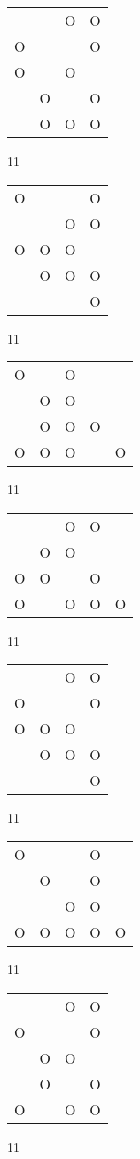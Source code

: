 \begin{tabular}{|m{0.2cm}m{0.2cm}m{0.2cm}m{0.2cm}|}\hline
 & &O&O\\
O& & &O\\
O& &O& \\
 &O& &O\\
 &O&O&O\\
\hline\end{tabular}11
\begin{tabular}{|m{0.2cm}m{0.2cm}m{0.2cm}m{0.2cm}|}\hline
O& & &O\\
 & &O&O\\
O&O&O& \\
 &O&O&O\\
 & & &O\\
\hline\end{tabular}11
\begin{tabular}{|m{0.2cm}m{0.2cm}m{0.2cm}m{0.2cm}m{0.2cm}|}\hline
O& &O& & \\
 &O&O& & \\
 &O&O&O& \\
O&O&O& &O\\
\hline\end{tabular}11
\begin{tabular}{|m{0.2cm}m{0.2cm}m{0.2cm}m{0.2cm}m{0.2cm}|}\hline
 & &O&O& \\
 &O&O& & \\
O&O& &O& \\
O& &O&O&O\\
\hline\end{tabular}11
\begin{tabular}{|m{0.2cm}m{0.2cm}m{0.2cm}m{0.2cm}|}\hline
 & &O&O\\
O& & &O\\
O&O&O& \\
 &O&O&O\\
 & & &O\\
\hline\end{tabular}11
\begin{tabular}{|m{0.2cm}m{0.2cm}m{0.2cm}m{0.2cm}m{0.2cm}|}\hline
O& & &O& \\
 &O& &O& \\
 & &O&O& \\
O&O&O&O&O\\
\hline\end{tabular}11
\begin{tabular}{|m{0.2cm}m{0.2cm}m{0.2cm}m{0.2cm}|}\hline
 & &O&O\\
O& & &O\\
 &O&O& \\
 &O& &O\\
O& &O&O\\
\hline\end{tabular}11
